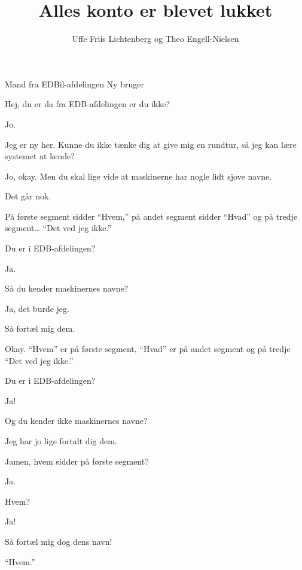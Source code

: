 \documentclass[10pt]{article}
\title{Alles konto er blevet lukket}
\author{Uffe Friis Lichtenberg og Theo Engell-Nielsen}
\begin{document}
\maketitle

\begin{sketch}

\begin{roles}
 Mand fra EDBil-afdelingen
 Ny bruger
\end{roles}

 Hej, du er da fra EDB-afdelingen er du ikke?

 Jo.

 Jeg er ny her. Kunne du ikke tænke dig at give mig en rundtur, så jeg kan lære systemet at kende?

 Jo, okay. Men du skal lige vide at maskinerne har nogle lidt sjove navne.

 Det går nok.

 På første segment sidder ``Hvem,'' på andet segment sidder ``Hvad'' og på tredje segment\ldots{} ``Det ved jeg ikke.''

 Du er i EDB-afdelingen?

 Ja.

 Så du kender maskinernes navne?

 Ja, det burde jeg.

 Så fortæl mig dem.

 Okay. ``Hvem'' er på første segment, ``Hvad'' er på andet segment og på tredje ``Det ved jeg ikke.''

 Du er i EDB-afdelingen?

 Ja!

 Og du kender ikke maskinernes navne?

 Jeg har jo lige fortalt dig dem.

 Jamen, hvem sidder på første segment?

 Ja.

 Hvem?

 Ja!

 Så fortæl mig dog dens navn!

 ``Hvem.''


\end{sketch}
\end{document}
